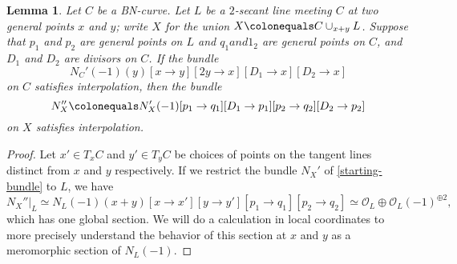 \documentclass[11pt]{amsart}
\renewcommand{\O}{\mathcal{O}}
\newtheorem{lem}[thm]{Lemma}
\theoremstyle{definition}
\theoremstyle{remark}
\begin{document}
\begin{lem}\label{mod_on_secant}
Let $C$ be a BN-curve.  Let $L$ be a $2$-secant line meeting $C$ at two general points $x$ and $y$; write $X $ for the union $X \colonequals C\cup_{x+y} L$.  Suppose that $p_1$ and $p_2$ are general points on $L$ and $q_1 and 1_2$ are general points on $C$, and $D_1$ and $D_2$ are divisors on $C$.
If the bundle
\[N_C'(-1)(y)[x \to y][2y \to x][D_1 \to x][D_2 \to x] \]
on $C$ satisfies interpolation, then the bundle
\begin{equation}\label{starting-bundle}N_X'' \colonequals N_X'(-1)[p_1 \to q_1][D_1 \to p_1][p_2 \to q_2][D_2 \to p_2]\end{equation}
on $X$ satisfies interpolation.
\end{lem}
\begin{proof}
Let $x' \in T_xC$ and $y' \in T_y C$ be choices of points on the tangent lines
distinct from $x$ and $y$ respectively.
If we restrict the bundle $N_X'$ of \eqref{starting-bundle} to $L$, we have
\[N_X''|_L \simeq N_L(-1)(x+y)[x\to x'][y \to y'][p_1 \to q_1][p_2 \to q_2] \simeq \O_L \oplus \O_L(-1)^{\oplus 2},  \]
which has one global section.  We will do a calculation in local coordinates to more precisely understand the behavior of this section at $x$ and $y$ as a meromorphic section of $N_L(-1)$.
  

\end{proof}
\end{document}
